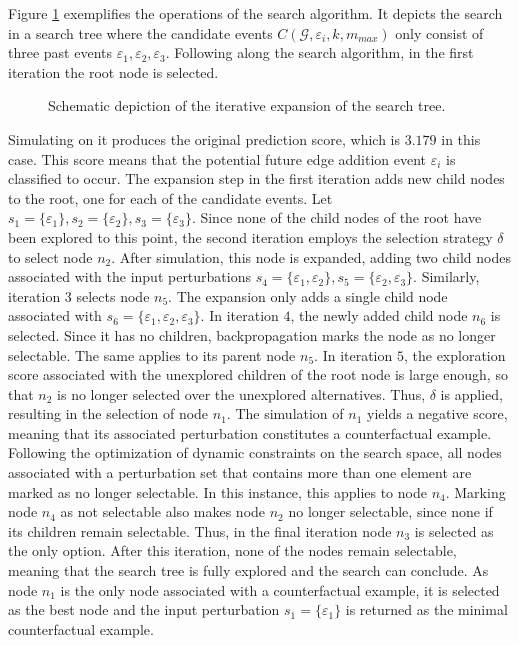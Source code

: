 Figure \ref{f_search_example} exemplifies the operations of the search algorithm. It depicts the search in a search tree where the candidate events $C(\mathcal{G}, \varepsilon_i, k, m_{max})$ only consist of three past events $\varepsilon_1, \varepsilon_2, \varepsilon_3$. Following along the search algorithm, in the first iteration the root node is selected. 
\begin{figure}[ht!]
    \centering
    
    \caption{Schematic depiction of the iterative expansion of the search tree.}
    \label{f_search_example}
\end{figure}
Simulating on it produces the original prediction score, which is $3.179$ in this case. This score means that the potential future edge addition event $\varepsilon_i$ is classified to occur. The expansion step in the first iteration adds new child nodes to the root, one for each of the candidate events. Let $s_1 = \{\varepsilon_1\}, s_2 = \{\varepsilon_2\}, s_3 = \{\varepsilon_3\}$. Since none of the child nodes of the root have been explored to this point, the second iteration employs the selection strategy $\delta$ to select node $n_2$. After simulation, this node is expanded, adding two child nodes associated with the input perturbations $s_4 = \{\varepsilon_1, \varepsilon_2\}, s_5 = \{\varepsilon_2, \varepsilon_3\}$. Similarly, iteration $3$ selects node $n_5$. The expansion only adds a single child node associated with $s_6 = \{\varepsilon_1, \varepsilon_2, \varepsilon_3\}$. In iteration $4$, the newly added child node $n_6$ is selected. Since it has no children, backpropagation marks the node as no longer selectable. The same applies to its parent node $n_5$. In iteration $5$, the exploration score associated with the unexplored children of the root node is large enough, so that $n_2$ is no longer selected over the unexplored alternatives. Thus, $\delta$ is applied, resulting in the selection of node $n_1$. The simulation of $n_1$ yields a negative score, meaning that its associated perturbation constitutes a counterfactual example. Following the optimization of dynamic constraints on the search space, all nodes associated with a perturbation set that contains more than one element are marked as no longer selectable. In this instance, this applies to node $n_4$. Marking node $n_4$ as not selectable also makes node $n_2$ no longer selectable, since none if its children remain selectable. Thus, in the final iteration node $n_3$ is selected as the only option. After this iteration, none of the nodes remain selectable, meaning that the search tree is fully explored and the search can conclude. As node $n_1$ is the only node associated with a counterfactual example, it is selected as the best node and the input perturbation $s_1 = \{\varepsilon_1\}$ is returned as the minimal counterfactual example.

